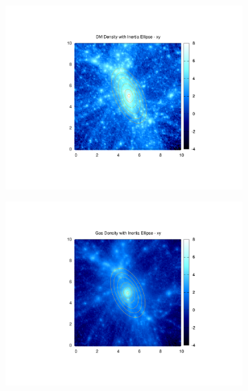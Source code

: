 \documentclass[journal]{IEEEtran}
\begin{document}
\begin{figure}[!t]
\centering
	\begin{subfigure}[t]{0.3\textwidth}
		\centering
		\includegraphics[width=\linewidth]{DMDenEllipxy.pdf}
	\end{subfigure}
	\quad
	\begin{subfigure}[t]{0.3\textwidth}
		\centering
		\includegraphics[width=\linewidth]{GasDenEllipxy.pdf}
	\end{subfigure}
	\quad
	\begin{subfigure}[t]{0.3\textwidth}
		\centering

\end{subfigure}
\end{figure}
\end{document}
